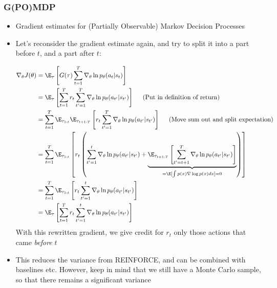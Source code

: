 \subsubsection{G(PO)MDP}
\begin{itemize}
	\item Gradient estimates for (Partially Observable) Markov Decision Processes
	\item Let's reconsider the gradient estimate again, and try to split it into a part before $t$, and a part after $t$:
	
	\begin{equation*}
		\begin{split}
			\nabla_{\theta}J(\theta) & =  \E_{\tau}\left[G(\tau)\sum_{t=1}^{T}\nabla_{\theta} \ln p_{\theta}(a_t|s_t)\right]\\
			& = \E_{\tau}\left[\sum_{t=1}^{T} r_t \sum_{t'=1}^{T}\nabla_{\theta} \ln p_{\theta}(a_{t'}|s_{t'})\right]\hspace{5mm}\text{(Put in definition of return)}\\
			& = \sum_{t=1}^{T} \E_{\tau_{1:t}}\E_{\tau_{t+1:T}}\left[r_t \sum_{t'=1}^{T}\nabla_{\theta} \ln p_{\theta}(a_{t'}|s_{t'})\right]\hspace{5mm}\text{(Move sum out and split expectation)}\\
			& = \sum_{t=1}^{T} \E_{\tau_{1:t}}\left[r_t \left(\sum_{t'=1}^{t}\nabla_{\theta} \ln p_{\theta}(a_{t'}|s_{t'}) + \underbrace{\E_{\tau_{t+1:T}}\left[\sum_{t'=t+1}^{T}\nabla_{\theta} \ln p_{\theta}(a_{t'}|s_{t'})\right]}_{=\E[\int p(x)\nabla\log p(x)dx]=0}\right)\right]\\
			& = \sum_{t=1}^{T} \E_{\tau_{1:t}}\left[r_t \sum_{t'=1}^{t}\nabla_{\theta} \ln p_{\theta}(a_{t'}|s_{t'}) \right]\\
			& = \E_{\tau}\left[\sum_{t=1}^{T}  r_t \sum_{t'=1}^{t}\nabla_{\theta} \ln p_{\theta}(a_{t'}|s_{t'}) \right]
		\end{split}
	\end{equation*}
	With this rewritten gradient, we give credit for $r_t$ only those actions that came \textit{before} $t$
	\item This reduces the variance from REINFORCE, and can be combined with baselines etc. However, keep in mind that we still have a Monte Carlo sample, so that there remains a significant variance
\end{itemize}
